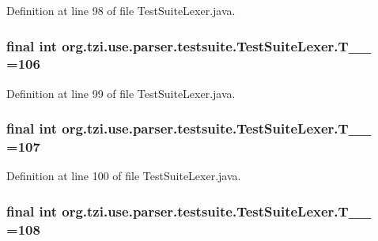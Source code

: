Definition at line 98 of file Test\-Suite\-Lexer.\-java.

\hypertarget{classorg_1_1tzi_1_1use_1_1parser_1_1testsuite_1_1_test_suite_lexer_acbd0a8d3142df8386731c240b7e5b0dd}{
\subsubsection[{T\-\_\-\-\_\-106}]{\setlength{\rightskip}{0pt plus 5cm}final int org.\-tzi.\-use.\-parser.\-testsuite.\-Test\-Suite\-Lexer.\-T\-\_\-\-\_ =106\hspace{0.3cm}{\ttfamily [static]}}}\label{classorg_1_1tzi_1_1use_1_1parser_1_1testsuite_1_1_test_suite_lexer_acbd0a8d3142df8386731c240b7e5b0dd}


Definition at line 99 of file Test\-Suite\-Lexer.\-java.

\hypertarget{classorg_1_1tzi_1_1use_1_1parser_1_1testsuite_1_1_test_suite_lexer_acaa7f522e8ca8607ae0cd949634ea681}{
\subsubsection[{T\-\_\-\-\_\-107}]{\setlength{\rightskip}{0pt plus 5cm}final int org.\-tzi.\-use.\-parser.\-testsuite.\-Test\-Suite\-Lexer.\-T\-\_\-\-\_ =107\hspace{0.3cm}{\ttfamily [static]}}}\label{classorg_1_1tzi_1_1use_1_1parser_1_1testsuite_1_1_test_suite_lexer_acaa7f522e8ca8607ae0cd949634ea681}


Definition at line 100 of file Test\-Suite\-Lexer.\-java.

\hypertarget{classorg_1_1tzi_1_1use_1_1parser_1_1testsuite_1_1_test_suite_lexer_a7f93b4aa0976129deb1cc2ed766fc9cb}{
\subsubsection[{T\-\_\-\-\_\-108}]{\setlength{\rightskip}{0pt plus 5cm}final int org.\-tzi.\-use.\-parser.\-testsuite.\-Test\-Suite\-Lexer.\-T\-\_\-\-\_ =108\hspace{0.3cm}{\ttfamily [static]}}}\label{classorg_1_1tzi_1_1use_1_1parser_1_1testsuite_1_1_test_suite_lexer_a7f93b4aa0976129deb1cc2ed766fc9cb}


